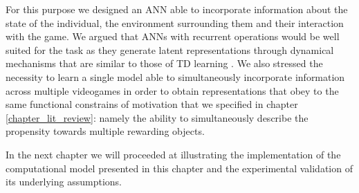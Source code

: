 For this purpose we designed an ANN able to incorporate information about the state of the individual, the environment surrounding them and their interaction with the game. We argued that ANNs with recurrent operations would be well suited for the task as they generate latent representations through dynamical mechanisms that are similar to those of TD learning \cite{barto2004reinforcement}. We also stressed the necessity to learn a single model able to simultaneously incorporate information across multiple videogames in order to obtain representations that obey to the same functional constrains of motivation that we specified in chapter \ref{chapter_lit_review}: namely the ability to simultaneously describe the propensity towards multiple rewarding objects. 

In the next chapter we will proceeded at illustrating the implementation of the computational model presented in this chapter and the experimental validation of its underlying assumptions.